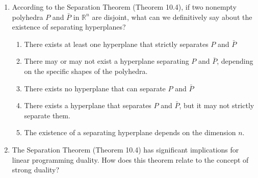 \documentclass{article}%
\begin{document}
\begin{enumerate}
\begin{enumerate}%
\item The Separation Theorem states that if a point is not in a convex set, there exists a hyperplane separating the point from the set. In duality, this means that if the primal and dual problems are both feasible but their objective function values differ, there exists a hyperplane separating their feasible regions.%
\item The Separation Theorem is irrelevant to linear programming duality; it's a purely geometric concept unrelated to optimization problems.%
\item The Separation Theorem states that if the primal problem is infeasible, then the dual problem must be unbounded, and vice versa.  This is directly related to the weak duality theorem.%
\item The Separation Theorem guarantees that if the primal problem is feasible and bounded, then the dual problem is also feasible and bounded, and their optimal objective function values are equal (strong duality).%
\item The Separation Theorem is only applicable to linear programming problems with a single constraint; it does not generalize to problems with multiple constraints.%
\end{enumerate}%
\vspace{1em}%
\item According to the Separation Theorem (Theorem 10.4), if two nonempty polyhedra $P$ and $\bar{P}$ in $\mathbb{R}^n$ are disjoint, what can we definitively say about the existence of separating hyperplanes?%
\begin{enumerate}%
\item There exists at least one hyperplane that strictly separates $P$ and $\bar{P}$%
\item There may or may not exist a hyperplane separating $P$ and $\bar{P}$, depending on the specific shapes of the polyhedra.%
\item There exists no hyperplane that can separate $P$ and $\bar{P}$%
\item There exists a hyperplane that separates $P$ and $\bar{P}$, but it may not strictly separate them.%
\item The existence of a separating hyperplane depends on the dimension $n$.%
\end{enumerate}%
\vspace{1em}%
\item The Separation Theorem (Theorem 10.4) has significant implications for linear programming duality.  How does this theorem relate to the concept of strong duality?%

\end{enumerate}
\end{document}
